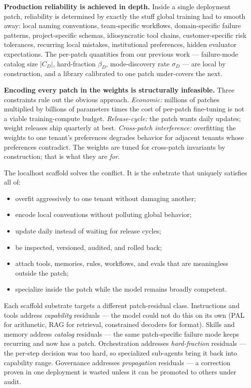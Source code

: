 \documentclass[
]{article}
\providecommand{\tightlist}{%
  \setlength{\itemsep}{0pt}\setlength{\parskip}{0pt}}
\begin{document}
\textbf{Production reliability is achieved in depth.} Inside a single
deployment patch, reliability is determined by exactly the stuff global
training had to smooth away: local naming conventions, team-specific
workflows, domain-specific failure patterns, project-specific schemas,
idiosyncratic tool chains, customer-specific risk tolerances, recurring
local mistakes, institutional preferences, hidden evaluator
expectations. The per-patch quantities from our previous work ---
failure-mode catalog size \(|C_D|\), hard-fraction \(\beta_D\),
mode-discovery rate \(\sigma_D\) --- are local by construction, and a
library calibrated to one patch under-covers the next.

\textbf{Encoding every patch in the weights is structurally infeasible.}
Three constraints rule out the obvious approach. \emph{Economic:}
millions of patches multiplied by billions of parameters times the cost
of per-patch fine-tuning is not a viable training-compute budget.
\emph{Release-cycle:} the patch wants daily updates; weight releases
ship quarterly at best. \emph{Cross-patch interference:} overfitting the
weights to one tenant's preferences degrades behavior for adjacent
tenants whose preferences contradict. The weights are tuned for
cross-patch invariants by construction; that is what they are
\emph{for}.

The localhost scaffold solves the conflict. It is the substrate that
uniquely satisfies all of:

\begin{itemize}
\tightlist
\item
  overfit aggressively to one tenant without damaging another;
\item
  encode local conventions without polluting global behavior;
\item
  update daily instead of waiting for release cycles;
\item
  be inspected, versioned, audited, and rolled back;
\item
  attach tools, memories, rules, workflows, and evals that are
  meaningless outside the patch;
\item
  specialize inside the patch while the model remains broadly competent.
\end{itemize}

Each scaffold substrate targets a different patch-residual class.
Instructions and tools address \emph{capability} residuals --- the model
could not do this on its own (PAL for arithmetic, RAG for retrieval,
constrained decoders for format). Skills and memory address
\emph{catalog} residuals --- the same patch-specific failure mode keeps
recurring and now has a patch. Orchestration addresses
\emph{hard-fraction} residuals --- the per-step decision was too hard,
so specialized sub-agents bring it back into capability range.
Governance addresses \emph{propagation} residuals --- a correction
proven in one deployment is wasted unless it can be promoted to others
under audit.
\end{document}
